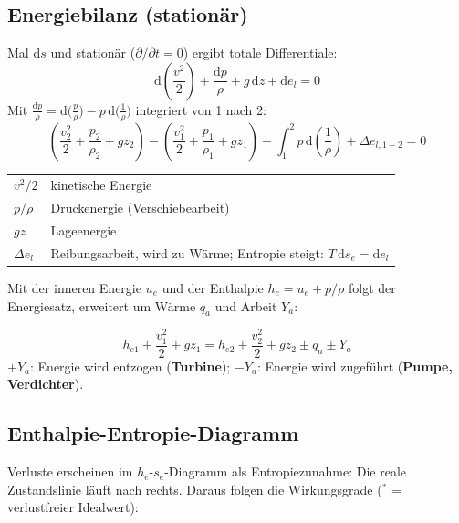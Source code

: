 \documentclass[11pt,a4paper]{article}
\newcommand{\dd}{\mathrm{d}}
\begin{document}
\subsection{Energiebilanz (stationär)}

Mal $\dd s$ und stationär ($\partial/\partial t = 0$) ergibt totale Differentiale:
\[
\dd\!\left(\frac{v^2}{2}\right) + \frac{\dd p}{\rho} + g\,\dd z + \dd e_l = 0
\]
Mit $\frac{\dd p}{\rho} = \dd\bigl(\frac{p}{\rho}\bigr) - p\,\dd\bigl(\frac{1}{\rho}\bigr)$ integriert von 1 nach 2:
\[
\left(\frac{v_2^2}{2} + \frac{p_2}{\rho_2} + g z_2\right) - \left(\frac{v_1^2}{2} + \frac{p_1}{\rho_1} + g z_1\right) - \int_1^2 p\,\dd\!\left(\frac{1}{\rho}\right) + \Delta e_{l,1-2} = 0
\]

\begin{center}
\small
\begin{tabular}{@{}ll@{}}
\toprule
$v^2/2$ & kinetische Energie \\
$p/\rho$ & Druckenergie (Verschiebearbeit) \\
$g z$ & Lageenergie \\
$\Delta e_l$ & Reibungsarbeit, wird zu Wärme; Entropie steigt: $T\,\dd s_e = \dd e_l$ \\
\bottomrule
\end{tabular}
\end{center}

Mit der inneren Energie $u_e$ und der Enthalpie $h_e = u_e + p/\rho$ folgt der Energiesatz, erweitert um Wärme $q_a$ und Arbeit $Y_a$:
\begin{formel}[title={Energiesatz}]
\[
h_{e1} + \frac{v_1^2}{2} + g z_1 = h_{e2} + \frac{v_2^2}{2} + g z_2 \pm q_a \pm Y_a
\]
$+Y_a$: Energie wird entzogen (\textbf{Turbine}); $-Y_a$: Energie wird zugeführt (\textbf{Pumpe, Verdichter}).
\end{formel}

\subsection{Enthalpie-Entropie-Diagramm}

Verluste erscheinen im $h_e$-$s_e$-Diagramm als Entropiezunahme: Die reale Zustandslinie läuft nach rechts. Daraus folgen die Wirkungsgrade ($^*$ = verlustfreier Idealwert):
\end{document}
